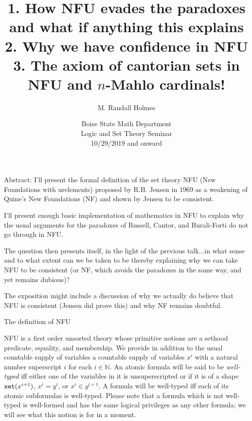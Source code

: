 \documentclass{slides}
\title{1.  How NFU evades the paradoxes and what if anything this explains\\
2.  Why we have confidence in NFU\\
3.  The axiom of cantorian sets in NFU and $n$-Mahlo cardinals!}
\author{M. Randall Holmes}
\date{Boise State Math Department \\
Logic and Set Theory Seminar \\
10/29/2019 and onward}
\begin{document}
\begin{slide}

\maketitle

Abstract: I'll present the formal definition of the set theory NFU (New Foundations with urelements) proposed by R.B. Jensen in 1969 as a weakening of Quine's New Foundations (NF) and shown by Jensen to be consistent.

I'll present enough basic implementation of mathematics in NFU to explain why the usual arguments for the paradoxes of Russell, Cantor, and Burali-Forti do not go through in NFU.

The question then presents itself, in the light of the previous talk...in what sense and to what extent can  we be taken to be  thereby
explaining why we can take NFU to be consistent (or NF, which avoids the paradoxes in the same way, and yet remains dubious)?

The exposition might include a discussion of why we actually do believe that NFU is consistent (Jensen did prove this) and why NF remains doubtful.



\end{slide}

\begin{slide}

{\Large The definition of NFU}

NFU is a first order unsorted theory whose primitive notions are a sethood predicate, equality, and membership.  We provide in addition to the usual countable supply of variables
a countable supply of variables $x^i$ with a natural number superscript $i$ for each $i \in {\mathbb N}$.  An atomic formula will be said to be {\em well-typed\/} iff either one of the variables in it is unsuperscripted or if it is of a shape ${\tt set}(x^{i+1})$, $x^i = y^i$, or $x^i \in y^{i+1}$.  A formula will be well-typed iff each of its atomic subformulas is well-typed.  Please note that a formula which is not well-typed is well-formed and has the same logical privileges as any other formula;  we will see what this notion is for in a moment.

\end{slide}
\end{document}
